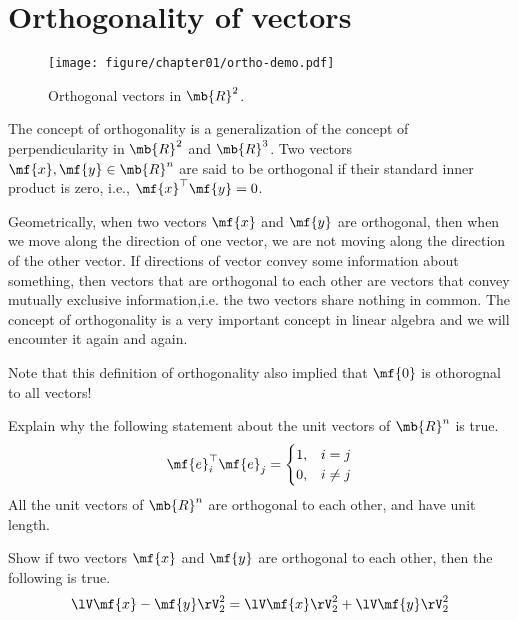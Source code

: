 \section{Orthogonality of vectors}

\begin{wrapfigure}{r}{0.4\textwidth}
    \centering
    \texttt{[image: figure/chapter01/ortho-demo.pdf]}
    \caption{Orthogonal vectors in $\mb{R}^2$.}
    \label{fig:ch01-orthog-vectors}
\end{wrapfigure}
The concept of orthogonality is a generalization of the concept of perpendicularity in $\mb{R}^2$ and $\mb{R}^3$. Two vectors $\mf{x}, \mf{y} \in \mb{R}^n$ are said to be orthogonal if their standard inner product is zero, i.e., $\mf{x}^\top\mf{y} = 0$.

Geometrically, when two vectors $\mf{x}$ and $\mf{y}$ are orthogonal, then when we move along the direction of one vector, we are not moving along the direction of the other vector. If directions of vector convey some information about something, then vectors that are orthogonal to each other are vectors that convey mutually exclusive information,i.e. the two vectors share nothing in common. The concept of orthogonality is a very important concept in linear algebra and we will encounter it again and again.

Note that this definition of orthogonality also implied that $\mf{0}$ is othorognal to all vectors!

\begin{boxedstuff}
    \begin{problem}
        Explain why the following statement about the unit vectors of $\mb{R}^n$ is true.
        \[ \mf{e}_i^\top\mf{e}_j = \begin{cases} 1, & i = j \\ 0, & i \neq j \end{cases} \]
        All the unit vectors of $\mb{R}^n$ are orthogonal to each other, and have unit length.
    \end{problem}
    \begin{problem}
        Show if two vectors $\mf{x}$ and $\mf{y}$ are orthogonal to each other, then the following is true.
        \[ \lV \mf{x} - \mf{y} \rV_2^2 = \lV \mf{x} \rV_2^2 + \lV \mf{y} \rV_2^2 \]
    \end{problem}
\end{boxedstuff}

